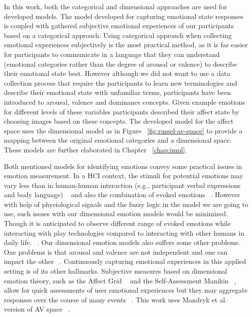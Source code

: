 In this work, both the categorical and dimensional approaches are used for developed models. The model developed for capturing emotional state responses is coupled with gathered subjective emotional experiences of our participants based on a categorical approach. Using categorical approach when collecting emotional experiences subjectively is the most practical method, as it is far easier for participants to communicate in a language that they can understand (emotional categories rather than the degree of arousal or valence) to describe their emotional state best. However although we did not want to use a data collection process that require the participants to learn new terminologies and describe their emotional state with unfamiliar terms, participants have been introduced to arousal, valence and dominance concepts. Given example emotions for different levels of these variables participants described their affect state by choosing images based on these concepts. The developed model for the affect space uses the dimensional model as in Figure ~\ref{fig:russel-av-space} to provide a mapping between the original emotional categories and a dimensional space. These models are further elaborated in Chapter ~\ref{chap:impl}.

Both mentioned models for identifying emotions convey some practical issues in emotion measurement. In a HCI context, the stimuli for potential emotions may vary less than in human-human interaction (e.g., participant verbal expressions and body language) ~\cite{zhang2010service} and also the combination of evoked emotions ~\cite{peter2006emotion}. However with help of physiological signals and the fuzzy logic in the model we are going to use, such issues with our dimensional emotion models would be minimized. Though it is anticipated to observe different range of evoked emotions while interacting with play technologies compared to interacting with other humans in daily life. ~\cite{zhang2010service}. Our dimensional emotion models also suffers some other problems. One problems is that arousal and valence are not independent and one can impact the other ~\cite{mandryk2007fuzzy}. Continuously capturing emotional experiences in this applied setting is of its other hallmarks. Subjective measures based on dimensional emotion theory, such as the Affect Grid ~\cite{russell1989affect} and the Self-Assessment Manikin ~\cite{bradley1994measuring}, allow for quick assessments of user emotional experiences but they may aggregate responses over the course of many events ~\cite{zhang2010service}. This work uses Mandryk et al. version of AV space ~\cite{mandryk2007fuzzy}.

